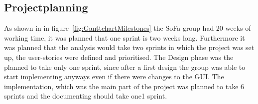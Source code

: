 \subsection{Projectplanning}
As shown in in figure~\ref{fig:GanttchartMilestones} the SoFa group had 20 weeks of working time, it was planned that one sprint is two weeks long. Furthermore it was planned that the analysis would take two sprints in which the project was set up, the user-stories were defined and prioritised. The Design phase was the planned to take only one sprint, since after a first design the group was able to start implementing anyways even if there were changes to the GUI.
The implementation, which was the main part of the project was planned to take 6 sprints and the documenting should take one1 sprint.